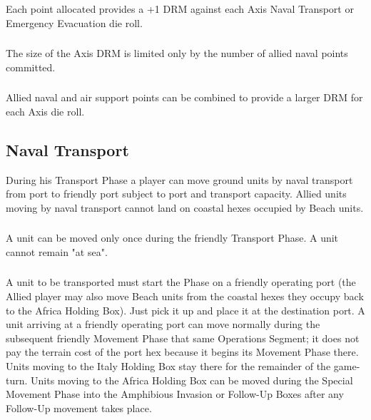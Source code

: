 \subsubsection{} Each point allocated provides a +1 DRM against each Axis Naval Transport or Emergency Evacuation die roll.

\subsubsection{} The size of the Axis DRM is limited only by the number of allied naval points committed.

\subsubsection{} Allied naval and air support points can be combined to provide a larger DRM for each Axis die roll.

\subsection{Naval Transport}

During his Transport Phase a player can move ground units by naval transport from port to friendly port subject to port and transport capacity. Allied units moving by naval transport cannot land on coastal hexes occupied by Beach units.

\subsubsection{} A unit can be moved only once during the friendly Transport Phase. A unit cannot remain "at sea".

\subsubsection{} A unit to be transported must start the Phase on a friendly operating port (the Allied player may also move Beach units from the coastal hexes they occupy back to the Africa Holding Box). Just pick it up and place it at the destination port. A unit arriving at a friendly operating port can move normally during the subsequent friendly Movement Phase that same Operations Segment; it does not pay the terrain cost of the port hex because it begins its Movement Phase there. Units moving to the Italy Holding Box stay there for the remainder of the game-turn. Units moving to the Africa Holding Box can be moved during the Special Movement Phase into the Amphibious Invasion or Follow-Up Boxes after any Follow-Up movement takes place.

